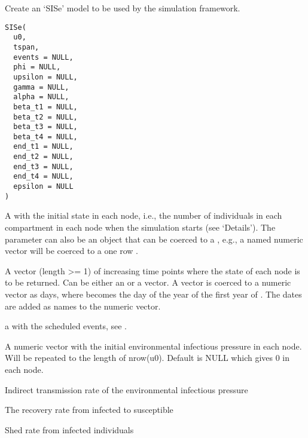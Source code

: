 \documentclass[letterpaper]{book}
\begin{document}
%
\begin{Description}
Create an `SISe' model to be used by the simulation
framework.
\end{Description}
%
\begin{Usage}
\begin{verbatim}
SISe(
  u0,
  tspan,
  events = NULL,
  phi = NULL,
  upsilon = NULL,
  gamma = NULL,
  alpha = NULL,
  beta_t1 = NULL,
  beta_t2 = NULL,
  beta_t3 = NULL,
  beta_t4 = NULL,
  end_t1 = NULL,
  end_t2 = NULL,
  end_t3 = NULL,
  end_t4 = NULL,
  epsilon = NULL
)
\end{verbatim}
\end{Usage}
%
\begin{Arguments}
\begin{ldescription}
\item[\code{u0}] A  with the initial state in each node,
i.e., the number of individuals in each compartment in each
node when the simulation starts (see `Details'). The
parameter  can also be an object that can be coerced
to a , e.g., a named numeric vector will be
coerced to a one row .

\item[\code{tspan}] A vector (length >= 1) of increasing time points
where the state of each node is to be returned. Can be either
an  or a  vector. A 
vector is coerced to a numeric vector as days, where
 becomes the day of the year of the first year
of . The dates are added as names to the numeric
vector.

\item[\code{events}] a  with the scheduled events, see
.

\item[\code{phi}] A numeric vector with the initial environmental
infectious pressure in each node. Will be repeated to the
length of nrow(u0). Default is NULL which gives 0 in each
node.

\item[\code{upsilon}] Indirect transmission rate of the environmental
infectious pressure

\item[\code{gamma}] The recovery rate from infected to susceptible

\item[\code{alpha}] Shed rate from infected individuals


\end{ldescription}
\end{Arguments}
\end{document}
